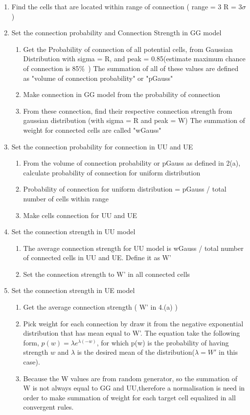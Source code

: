 \begin{enumerate}
 \item Find the cells that are located within range of connection ( range = 3 R = 3$\sigma$)
 \item Set the connection probability and Connection Strength in GG model
 \begin{enumerate}
   \item Get the Probability of connection of all potential cells, from Gaussian Distribution with sigma = R, and peak = 0.85(estimate maximum chance of connection is 85\%~\cite{reid1995specificity, mclaughlin2000neuronal})
   The summation of all of these values  are defined as  "volume of connection probability" or  "pGauss"
   \item Make connection in GG model from the probability of connection 
   \item From these connection, find their respective connection strength from gaussian distribution (with sigma = R and peak = W)
   The summation of weight for connected cells are called "wGauss"
   
    \end{enumerate}
 \item Set the connection probability for connection in UU and UE
  \begin{enumerate}
  \item From the volume of connection probability or pGauss as defined in 2(a), calculate probability of connection for uniform distribution
   \item Probability of connection for uniform distribution = pGauss / total number of cells within range 
   \item Make cells connection for UU and UE 
  \end{enumerate}
 \item Set the connection strength in UU model
  \begin{enumerate}
 \item The average connection strength for UU model is  wGauss / total number of connected cells in UU and UE. Define it as W'
\item Set the connection strength to W' in all connected cells

  \end{enumerate}

 \item Set the connection strength in UE model
   \begin{enumerate}
   \item Get the average connection strength ( W' in  4.(a) )
   \item Pick weight for each connection by draw it from the negative exponential distribution that has mean equal to W'. The equation take the following form, $ p(w) = \lambda e^ {\lambda(-w)}$, for which p(w) is the probability of having strength $w$ and $\lambda$ is the desired mean of the distribution($\lambda = W'$ in this case). 
   \item  Because the W values are from random generator, so the summation of W is not always equal to GG and UU,therefore a normalisation is need in order to make summation of weight for each target cell equalized in all convergent rules.


\end{enumerate}
\end{enumerate}

